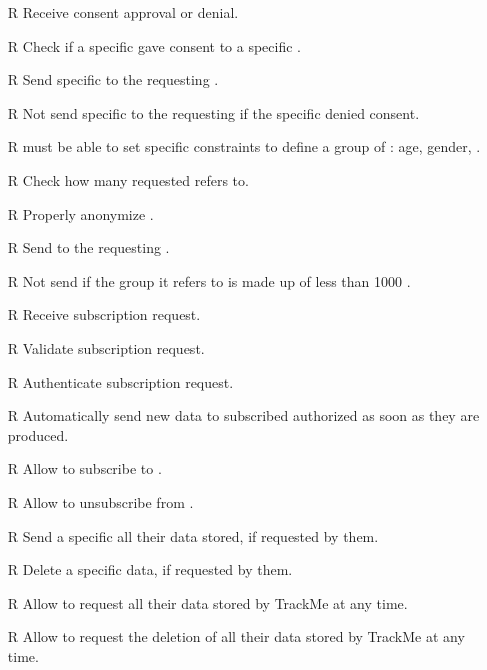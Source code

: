 \documentclass[../../../rasd.tex]{subfiles}
\begin{document}
\begin{itemize}
            \item[R\subs{17}]Receive  consent approval or denial.
            \item[R\subs{18}]Check if a specific  gave consent to a specific .
            \item[R\subs{19}]Send specific to the requesting .
            \item[R\subs{20}]Not send specific to the requesting  if the specific  denied consent.
            \item[R\subs{21}] must be able to set specific constraints to define a group of : age, gender, .
            \item[R\subs{22}]Check how many  requested  refers to.
            \item[R\subs{23}]Properly anonymize .
            \item[R\subs{24}]Send  to the requesting .
            \item[R\subs{25}]Not send  if the group it refers to is made up of less than 1000 .
            \item[R\subs{26}]Receive  subscription request.
            \item[R\subs{27}]Validate  subscription request.
            \item[R\subs{28}]Authenticate  subscription request.
            \item[R\subs{29}]Automatically send new data to subscribed authorized  as soon as they are produced.
            \item[R\subs{30}]Allow  to subscribe to .
            \item[R\subs{31}]Allow  to unsubscribe from .
            \item[R\subs{32}]Send a specific  all their data stored, if requested by them.
            \item[R\subs{33}]Delete a  specific data, if requested by them.
            \item[R\subs{34}]Allow  to request all their data stored by TrackMe at any time.
            \item[R\subs{35}]Allow  to request the deletion of all their data stored by TrackMe at any time.
        \end{itemize}
\end{document}
